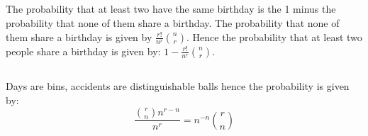 \documentclass[10pt,a4paper]{book}
\begin{document}
\subsection{}
The probability that at least two have the same birthday is the 1 minus the probability that none of them share a birthday. The probability that none of them share a birthday is given by $\frac{r!}{n^r}\binom{n}{r}$. Hence the probability that at least two people share a birthday is given by: $1 - \frac{r!}{n^r} \binom{n}{r}$.

\subsection{}
Days are bins, accidents are distinguishable balls hence the probability is given by:
\[
\frac{\binom{r}{n} n^{r - n}}{n^r}  = n^{-n} \binom{r}{n}
\]

\subsection{}
\end{document}
